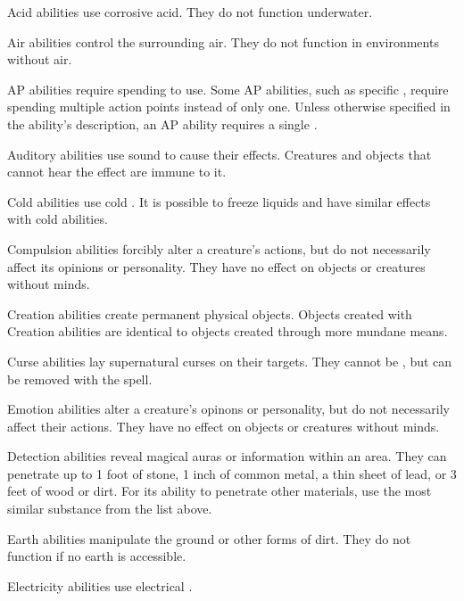          Acid abilities use corrosive acid.
        They do not function underwater.

         Air abilities control the surrounding air.
        They do not function in environments without air.

         AP abilities require spending  to use.
        Some AP abilities, such as specific , require spending multiple action points instead of only one.
        Unless otherwise specified in the ability's description, an AP ability requires a single .

         Auditory abilities use sound to cause their effects.
        Creatures and objects that cannot hear the effect are immune to it.

         Cold abilities use cold . It is possible to freeze liquids and have similar effects with cold abilities.

         Compulsion abilities forcibly alter a creature's actions, but do not necessarily affect its opinions or personality.
        They have no effect on objects or creatures without minds.

         Creation abilities create permanent physical objects.
        Objects created with Creation abilities are identical to objects created through more mundane means.

         Curse abilities lay supernatural curses on their targets.
        They cannot be , but can be removed with the  spell.

         Emotion abilities alter a creature's opinons or personality, but do not necessarily affect their actions.
        They have no effect on objects or creatures without minds.

         Detection abilities reveal magical auras or information within an area.
        They can penetrate up to 1 foot of stone, 1 inch of common metal, a thin sheet of lead, or 3 feet of wood or dirt.
        For its ability to penetrate other materials, use the most similar substance from the list above.

         Earth abilities manipulate the ground or other forms of dirt.
        They do not function if no earth is accessible.

         Electricity abilities use electrical .

